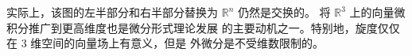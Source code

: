 \begin{remark}
  实际上，该图的左半部分和右半部分替换为 $\mathbb{R}^n$ 仍然是交换的。
  将 $\mathbb{R}^3$ 上的向量微积分推广到更高维度也是微分形式理论发展
  的主要动机之一。特别地，旋度仅仅在 $3$ 维空间的向量场上有意义，但是
  外微分是不受维数限制的。
\end{remark}






